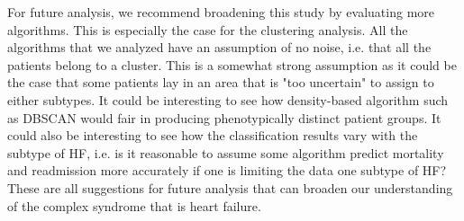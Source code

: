 \documentclass[../thesis.tex]{subfiles}
\begin{document}
\indent For future analysis, we recommend broadening this study by evaluating more algorithms. This is especially the case for the clustering analysis. All the algorithms that we analyzed have an assumption of no noise, i.e. that all the patients belong to a cluster. This is a somewhat strong assumption as it could be the case that some patients lay in an area that is "too uncertain" to assign to either subtypes. It could be interesting to see how density-based algorithm such as DBSCAN \citep{ester1996density} would fair in producing phenotypically distinct patient groups. It could also be interesting to see how the classification results vary with the subtype of HF, i.e. is it reasonable to assume some algorithm predict mortality and readmission more accurately if one is limiting the data one subtype of HF? These are all suggestions for future analysis that can broaden our understanding of the complex syndrome that is heart failure. 
\end{document}
